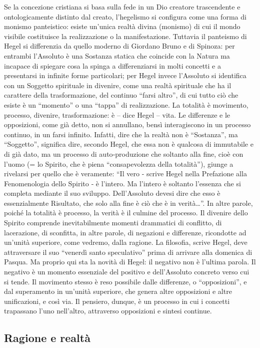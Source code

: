 \documentclass[a4paper,12pt,oneside,openany]{book}%
\begin{document}
Se la concezione cristiana si basa sulla fede in un Dio creatore trascendente e ontologicamente distinto dal creato, l’hegelismo si configura come una forma di monismo panteistico: esiste un’unica realtà divina (monismo) di cui il mondo visibile costituisce la realizzazione o la manifestazione.  Tuttavia il panteismo di Hegel si differenzia da quello moderno di Giordano Bruno e di Spinoza: per entrambi  l’Assoluto è una Sostanza statica che coincide con la Natura ma incapace di spiegare cosa la spinga a differenziarsi in molti concetti e a presentarsi in infinite forme particolari; per Hegel invece l’Assoluto si identifica con un Soggetto spirituale in divenire, come una realtà spirituale che ha il carattere della trasformazione, del continuo “farsi altro”, di cui tutto ciò che esiste è un “momento” o una “tappa” di realizzazione. La totalità è movimento, processo, divenire, trasformazione: è – dice Hegel – vita. Le differenze e le opposizioni, come già detto, non si annullano, bensì interagiscono in un processo continuo, in un farsi infinito. Infatti, dire che la realtà non è “Sostanza”, ma “Soggetto”, significa dire, secondo Hegel, che essa non è qualcosa di immutabile e di già dato, ma un processo di auto‑produzione che soltanto alla fine, cioè con l’uomo (= lo Spirito, che è piena “consapevolezza della totalità”), giunge a rivelarsi per quello che è veramente: “Il vero ‑ scrive Hegel nella Prefazione alla Fenomenologia dello Spirito ‑ è l’intero. Ma l’intero è soltanto l’essenza che si completa mediante il suo sviluppo. Dell’Assoluto devesi dire che esso è essenzialmente Risultato, che solo alla fine è ciò che è in verità…”. In altre parole, poiché la totalità è processo, la verità è il culmine del processo. Il divenire dello Spirito comprende inevitabilmente momenti drammatici di conflitto, di lacerazione, di sconfitta, in altre parole, di negazioni e differenze, ricondotte ad un’unità superiore, come vedremo, dalla ragione. La filosofia, scrive Hegel, deve attraversare il suo “venerdì santo speculativo” prima di arrivare alla domenica di Pasqua. Ma proprio qui sta la novità di Hegel: il negativo non è l’ultima parola. Il negativo è un momento essenziale del positivo e dell’Assoluto concreto verso cui si tende. Il movimento stesso è reso possibile dalle differenze, o “opposizioni”, e dal superamento in un’unità superiore, che genera altre opposizioni e altre unificazioni, e così via. Il pensiero, dunque, è un processo in cui i concetti trapassano l’uno nell’altro, attraverso opposizioni e sintesi continue.

\subsection*{ Ragione e realtà}
\end{document}
